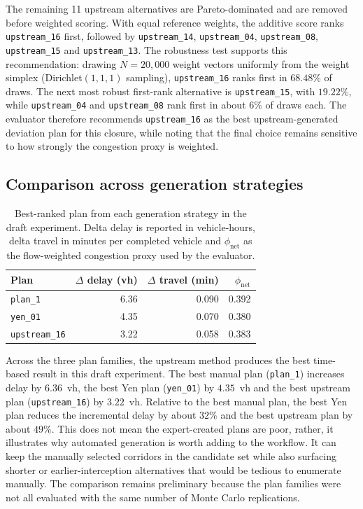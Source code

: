 The remaining 11 upstream alternatives are Pareto-dominated and are removed
before weighted scoring. With equal reference weights, the additive score
ranks \texttt{upstream\_16} first, followed by \texttt{upstream\_14},
\texttt{upstream\_04}, \texttt{upstream\_08}, \texttt{upstream\_15} and
\texttt{upstream\_13}. The robustness test supports this recommendation:
drawing $N=20{,}000$ weight vectors uniformly from the weight simplex
(Dirichlet$(1,1,1)$ sampling), \texttt{upstream\_16} ranks first in
$68.48\%$ of draws. The next most robust first-rank alternative is
\texttt{upstream\_15}, with $19.22\%$, while \texttt{upstream\_04} and
\texttt{upstream\_08} rank first in about $6\%$ of draws each. The evaluator
therefore recommends \texttt{upstream\_16} as the best upstream-generated
deviation plan for this closure, while noting that the final choice remains
sensitive to how strongly the congestion proxy is weighted.

\subsection{Comparison across generation strategies}

\begin{table}[H]
\centering
\begin{tabular}{@{}lrrr@{}}
\toprule
Plan & $\Delta$ delay (vh) & $\Delta$ travel (min) & $\phi_\text{net}$ \\
\midrule
\texttt{plan\_1} & 6.36 & 0.090 & 0.392 \\
\texttt{yen\_01} & 4.35 & 0.070 & 0.380 \\
\texttt{upstream\_16} & 3.22 & 0.058 & 0.383 \\
\bottomrule
\end{tabular}
\caption{Best-ranked plan from each generation strategy in the draft
experiment. Delta delay is reported in vehicle-hours, delta travel in minutes
per completed vehicle and $\phi_\text{net}$ as the flow-weighted congestion
proxy used by the evaluator.}
\label{tab:results_best_by_strategy}
\end{table}

Across the three plan families, the upstream method produces the best
time-based result in this draft experiment. The best manual plan
(\texttt{plan\_1}) increases delay by $6.36$~vh, the best Yen plan
(\texttt{yen\_01}) by $4.35$~vh and the best upstream plan
(\texttt{upstream\_16}) by $3.22$~vh. Relative to the best manual plan, the
best Yen plan reduces the incremental delay by about $32\%$ and the best
upstream plan by about $49\%$. This does not mean the expert-created plans are
poor, rather, it illustrates why automated generation is worth adding to the
workflow. It can keep the manually selected corridors in the candidate set
while also surfacing shorter or earlier-interception alternatives that would be
tedious to enumerate manually. The comparison remains preliminary because the
plan families were not all evaluated with the same number of Monte Carlo
replications.

